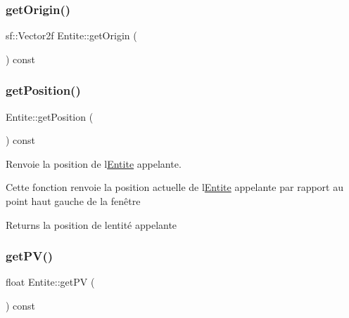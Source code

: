 \subsubsection{\texorpdfstring{get\+Origin()}{getOrigin()}}
{\footnotesize\ttfamily sf\+::\+Vector2f Entite\+::get\+Origin (\begin{DoxyParamCaption}{ }\end{DoxyParamCaption}) const\hspace{0.3cm}{\ttfamily [inline]}}

\mbox{\label{class_entite_a6f6fd1e1f9f6ad44f0ecc74961a774d9}} 
\subsubsection{\texorpdfstring{get\+Position()}{getPosition()}}
{\footnotesize\ttfamily Entite\+::get\+Position (\begin{DoxyParamCaption}{ }\end{DoxyParamCaption}) const\hspace{0.3cm}{\ttfamily [inline]}}



Renvoie la position de l\textquotesingle{}\mbox{\hyperlink{class_entite}{Entite}} appelante. 

Cette fonction renvoie la position actuelle de l\textquotesingle{}\mbox{\hyperlink{class_entite}{Entite}} appelante par rapport au point haut gauche de la fenêtre \begin{DoxyReturn}{Returns}
la position de l\textquotesingle{}entité appelante 
\end{DoxyReturn}
\mbox{\label{class_entite_aa803a384c574a66d2b104fafd43f189a}} 
\subsubsection{\texorpdfstring{get\+P\+V()}{getPV()}}
{\footnotesize\ttfamily float Entite\+::get\+PV (\begin{DoxyParamCaption}{ }\end{DoxyParamCaption}) const\hspace{0.3cm}{\ttfamily [inline]}}

\mbox{\label{class_entite_a474c3aad164255a66c0c9d39b6e4ed1f}} 
